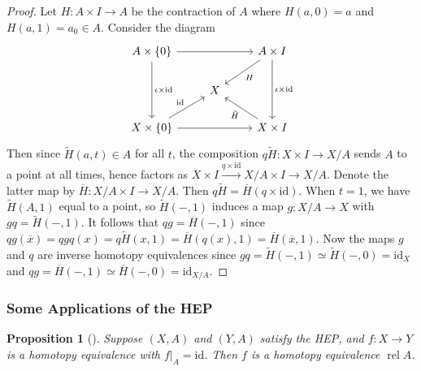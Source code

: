 \documentclass[reqno]{amsart}
\newtheorem{proposition}[theorem]{Proposition}
\theoremstyle{definition}
\theoremstyle{remark}
\DeclareMathOperator{\rel}{rel}
\newcommand{\id}{{\mathrm{id}}}
\begin{document}
\begin{proof}
    Let
    $H \colon A \times I \to A$ be the contraction of
    $A$ where
    $H(a,0) = a$ and $H(a,1) = a_0 \in A$.
    Consider the diagram
    \begin{equation*}
    \begin{tikzcd}
        A \times \left\{ 0 \right\} \ar[dd, "\iota \times \id"]
        \ar[rr] 
        & &
        A \times I \ar[dd, "\iota \times \id"] \ar[dl, "H"] \\
                                                    & X&\\
        X \times \left\{ 0 \right\} \ar[rr] \ar[ru,"\id"]
                                                    & & X \times I
        \ar[ul, "\tilde{H}"] 
    \end{tikzcd}
    \end{equation*}
    Then since 
    $\tilde{H}(a,t) \in A$ for all $t$,
    the composition $q \tilde{H} \colon X \times I \to X / A$ sends
    $A$ to a point at all times, hence factors as
    $X \times I \stackrel{q \times \id}{\to} X / A \times I
    \to X / A$. Denote the
    latter map by $\overline{H} \colon 
    X / A \times I \to X / A$. Then
    $q \tilde{H} = \overline{H} \left( q \times \id \right) $.
    When $t = 1$, we have
    $\tilde{H}\left( A,1 \right) $ equal to a point, so
    $\tilde{H}\left( -,1 \right) $ induces a map
    $g \colon X / A \to X$ with $g q = \tilde{H}
    \left( -,1 \right) $.
    It follows that
    $qg = \overline{H}(-,1)$ since
    $qg\left( \overline{x} \right) 
    =qg q(x) = q \tilde{H}(x,1) 
    = \overline{H} \left( q(x),1 \right) =
    \overline{H}\left( \overline{x},1 \right) $.
    Now the maps $g$ and $q$ are inverse homotopy
    equivalences since
    $gq = \tilde{H}(-,1) \simeq
    \tilde{H}(-,0) = \id_X$ and
    $qg = \overline{H}(-,1) \simeq
    \overline{H}(-,0) = \id_{X / A}$.
\end{proof}

\subsubsection{Some Applications of the HEP}

\begin{proposition}[]\label{Prop:HEP-Homotopy-Equivalence}
    Suppose $\left( X,A \right) $ and
    $\left( Y,A \right) $ satisfy the HEP, and 
    $f \colon X \to Y$ is a homotopy equivalence
    with $f |_{A} = \id$. Then $f$ is a homotopy equivalence
    $\rel A$.
\end{proposition}
\end{document}
